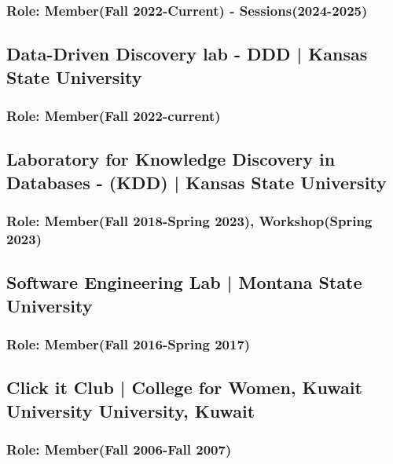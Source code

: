\documentclass[11pt]{article}
\begin{document}
\subsubsection{\normalfont Role: Member(Fall 2022-Current) - Sessions(2024-2025)}
\vspace{0.5em} %


\subsection{Data-Driven Discovery lab - DDD | \normalfont  Kansas State University   }
\subsubsection{ \normalfont Role: Member(Fall 2022-current)}
\vspace{0.5em} %


\subsection{Laboratory for Knowledge Discovery in Databases - (KDD) | \normalfont  Kansas State University   }
\subsubsection{ \normalfont Role: Member(Fall 2018-Spring 2023), Workshop(Spring 2023)}
\vspace{0.5em} %


\subsection{Software Engineering Lab | \normalfont  Montana State University   }
\subsubsection{\normalfont Role: Member(Fall 2016-Spring 2017)}
\vspace{0.5em} %

\subsection{Click it Club | \normalfont College for Women, Kuwait University University, Kuwait  }
\subsubsection{\normalfont Role: Member(Fall 2006-Fall 2007)}
\vspace{0.5em} %
\end{document}
